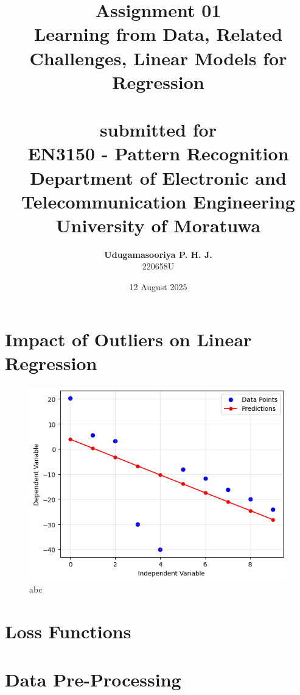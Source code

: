 \documentclass{article}[a4paper]
\title{
	\huge{\textbf{
		Assignment 01
	}}\\
	\Large{
		Learning from Data, Related Challenges, Linear Models for Regression
	}\\
	\large{\phantom{}}\\
	\large{
		submitted for
	}\\
	\LARGE{
		\textbf{EN3150 - Pattern Recognition}
	}\\
	\large{
		Department of Electronic and Telecommunication Engineering
	}
	\\
	\large{University of Moratuwa}
}
\author{
	\textbf{Udugamasooriya P. H. J.}\\
	220658U %
}
\date{12 August 2025}
\begin{document}
	\maketitle

	\section{Impact of Outliers on Linear Regression}

	\begin{figure}[H]
		\centering
		\includegraphics[width=0.8\linewidth]{images/q1.png}
		\caption{abc}
	\end{figure}

	\section{Loss Functions}

	\section{Data Pre-Processing}
\end{document}
